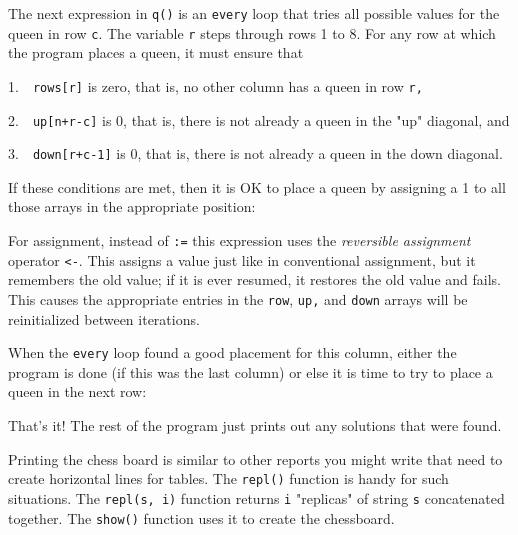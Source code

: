 The next expression in \texttt{q()} is an \texttt{every} loop that tries
all possible values for the queen in row \texttt{c}. The variable
\texttt{r} steps through rows 1 to 8. For any row at which the program
places a queen, it must ensure that

1.\ \ \texttt{rows[r]} is zero, that is, no other column has a queen in
row \texttt{r}\texttt{,}

2.\ \ \texttt{up[n+r-c]} is 0, that is, there is not already a queen in
the "up" diagonal, and

3.\ \ \texttt{down[r+c-1]} is 0, that is, there is not already a queen
in the down diagonal.

If these conditions are met, then it is OK to place a queen by assigning
a 1 to all those arrays in the appropriate position:


For assignment, instead of \texttt{:=} this expression
uses the \textit{reversible assignment}
operator \texttt{{\textless}-}. This assigns a value just like in
conventional assignment, but it remembers the old value; if it is ever
resumed, it restores the old value and fails.
This causes the appropriate entries in the \texttt{row},
\texttt{up}\texttt{,} and \texttt{down} arrays will be reinitialized
between iterations.

When the \texttt{every} loop found a good placement for this column,
either the program is done (if this was the last column) or else it is
time to try to place a queen in the next row:


That's it! The rest of the program just prints out any
solutions that were found.

Printing the chess board is similar to other reports you might write
that need to create horizontal lines for tables. The \texttt{repl()}
function is handy for such situations. The \texttt{repl(s, i)} function
returns \texttt{i} "replicas" of string
\texttt{s} concatenated together. The \texttt{show()} function uses it
to create the chessboard.\textit{ }

